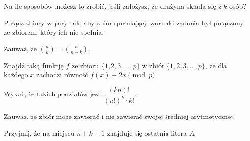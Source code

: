 
\begin{hints_list}
	\item Na ile sposobów możesz to zrobić, jeśli założysz, że drużyna składa się z $k$ osób?
	\item Połącz zbiory w pary tak, aby zbiór spełniający warunki zadania był połączony ze zbiorem, który ich nie spełnia.
	\item Zauważ, że ${{n}\choose{k}} = {{n}\choose{n - k}}$.
	\item Znajdź taką funkcję $f$ ze zbioru $\{1, 2, 3,..., p\}$ w zbiór $\{1, 2, 3,..., p\}$, że dla każdego $x$ zachodzi równość $f(x) \equiv 2x \pmod{p}$.
	\item Wykaż, że takich podziałów jest $\dfrac{(kn)!}{(n!)^k \cdot k!}$.
	\item Zauważ, że zbiór może zawierać i nie zawierać swojej średniej arytmetycznej.
	\item Przyjmij, że na miejscu $n + k + 1$ znajduje się ostatnia litera $A$.
\end{hints_list}